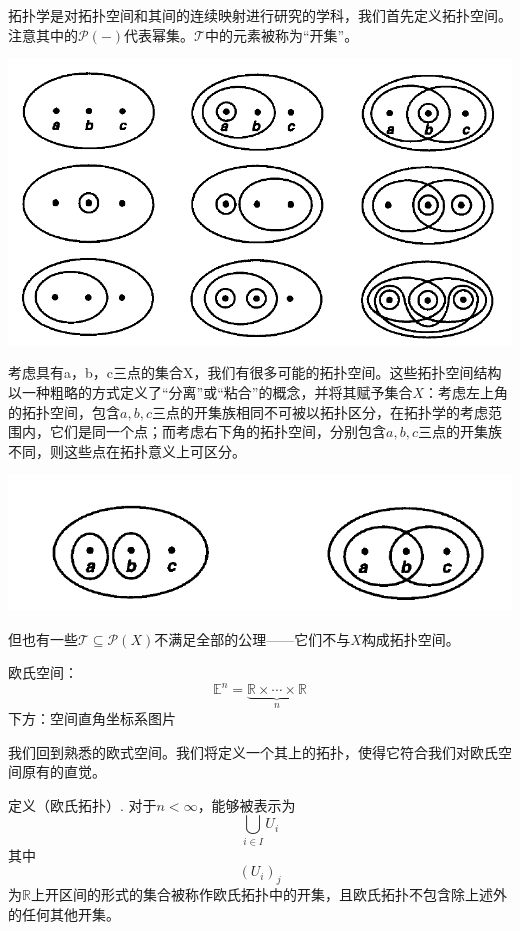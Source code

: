 \documentclass[10pt]{article}
\begin{document}
拓扑学是对拓扑空间和其间的连续映射进行研究的学科，我们首先定义拓扑空间。注意其中的$\mathcal{P}(-)$代表幂集。$\mathcal{T}$中的元素被称为“开集”。

\begin{tcolorbox}[colback=yellow]
\includegraphics{1}
\end{tcolorbox}

考虑具有a，b，c三点的集合X，我们有很多可能的拓扑空间。这些拓扑空间结构以一种粗略的方式定义了“分离”或“粘合”的概念，并将其赋予集合$X$：考虑左上角的拓扑空间，包含$a,b,c$三点的开集族相同不可被以拓扑区分，在拓扑学的考虑范围内，它们是同一个点；而考虑右下角的拓扑空间，分别包含$a,b,c$三点的开集族不同，则这些点在拓扑意义上可区分。

\begin{tcolorbox}[colback=yellow]
\includegraphics{2}
\end{tcolorbox}

但也有一些$\mathcal{T}\subseteq\mathcal{P}(X)$不满足全部的公理——它们不与$X$构成拓扑空间。

\begin{tcolorbox}[colback=yellow]
欧氏空间：$$\mathbb{E}^n=\underbrace{\mathbb{R}\times\cdots\times\mathbb{R}}_{n}$$
下方：空间直角坐标系图片
\end{tcolorbox}

我们回到熟悉的欧式空间。我们将定义一个其上的拓扑，使得它符合我们对欧氏空间原有的直觉。

\begin{tcolorbox}[colback=gray]
定义（欧氏拓扑）. 对于$n<\infty$，能够被表示为
$$\bigcup_{i\in I}U_i$$
其中
$$(U_i)_j$$
为$\mathbb{R}$上开区间的形式的集合被称作欧氏拓扑中的开集，且欧氏拓扑不包含除上述外的任何其他开集。
\end{tcolorbox}
\end{document}
